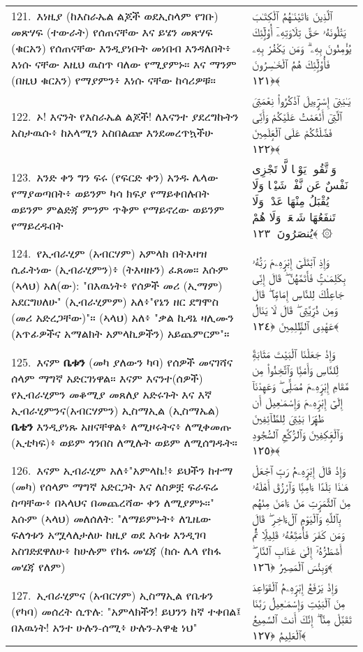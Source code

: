 \documentclass[11pt,a4paper,oneside]{article}%
\newcommand{\mytextarabic}[1]{\textarabic{ #1 \flushright}}
\begin{document}
\begin{longtable}{%
  @{}
    p{}
  @{~~~}
    p{}
    @{}
}
121.\ እነዚያ (ከእስራኤል ልጆች ወደኢስላም የገቡ) መጽሃፍ (ተውራት) የሰጠናቸው እና ይሄን መጽሃፍ (ቁርአን) የሰጠናቸው እንዲያነቡት መነበብ እንዳለበት፥ እነሱ ናቸው እዚህ ዉስጥ ባለው የሚያምኑ። እና ማንም (በዚህ ቁርአን) የማያምን፥ እነሱ ናቸው ከሳሪዎቹ። &  \mytextarabic{ ٱلَّذِينَ ءَاتَيْنَـٰهُمُ ٱلْكِتَـٰبَ يَتْلُونَهُۥ حَقَّ تِلَاوَتِهِۦٓ أُو۟لَٟٓئِكَ يُؤْمِنُونَ بِهِۦ ۗ وَمَن يَكْفُرْ بِهِۦ فَأُو۟لَٟٓئِكَ هُمُ ٱلْخَـٰسِرُونَ ﴿١٢١﴾}\\
122.\ ኦ! እናንት የእስራኤል ልጆች! ለእናንተ ያደረግኩትን አስታዉሱ፥ ከአላሚን አስበልጬ እንደመረጥኳችሁ &  \mytextarabic{يَـٰبَنِىٓ إِسْرَٟٓءِيلَ ٱذْكُرُوا۟ نِعْمَتِىَ ٱلَّتِىٓ أَنْعَمْتُ عَلَيْكُمْ وَأَنِّى فَضَّلْتُكُمْ عَلَى ٱلْعَٟلَمِينَ ﴿١٢٢﴾}\\
123.\ አንድ ቀን ግን ፍሩ (የፍርድ ቀን) አንዱ ሌላው የማያወጣበት፥ ወይንም ካሳ ክፍያ የማይቀበሉበት  ወይንም ምልድጃ ምንም ጥቅም የማይኖረው ወይንም የማይረዱበት &  \mytextarabic{وَٱتَّقُوا۟ يَوْمًۭا لَّا تَجْزِى نَفْسٌ عَن نَّفْسٍۢ شَيْـًۭٔا وَلَا يُقْبَلُ مِنْهَا عَدْلٌۭ وَلَا تَنفَعُهَا شَفَٟعَةٌۭ وَلَا هُمْ يُنصَرُونَ ﴿١٢٣﴾ ۞}\\
124.\ የኢብራሂም (አብርሃም) አምላክ በትእዛዝ ሲፈትነው (ኢብራሂምን)፥ (ትእዛዙን) ፈጸመ። እሱም (ኣላህ) አለ(ው): "በእዉነት፥ የሰዎች መሪ (ኢማም) አደርግሀለሁ" (ኢብራሂምም) አለ፥"የኔን ዘር ደግሞስ (መሪ አድረጋቸው)"። (ኣላህ) አለ፥ "ቃል ኪዳኔ ዛሊሙን (አጥፊዎችና አማልክት አምላኪዎችን) አይጨምርም"። &  \mytextarabic{وَإِذِ ٱبْتَلَىٰٓ إِبْرَٟهِۦمَ رَبُّهُۥ بِكَلِمَـٰتٍۢ فَأَتَمَّهُنَّ ۖ قَالَ إِنِّى جَاعِلُكَ لِلنَّاسِ إِمَامًۭا ۖ قَالَ وَمِن ذُرِّيَّتِى ۖ قَالَ لَا يَنَالُ عَهْدِى ٱلظَّٟلِمِينَ ﴿١٢٤﴾}\\
125.\ እናም  {\bf ቤቱን} (መካ ያለውን ካባ) የሰዎች መናገሻና ሰላም ማግኛ አድርገነዋል። እናም እናንተ(ሰዎች) የኢብራሂምን መቆሚያ መጸለያ አድሩጉት እና እኛ ኢብራሂምንና(አብርሃምን) ኢስማኢል (ኢስማኤል) {\bf ቤቴን} እንዲያነጹ አዘናቸዋል፥ ለሚዞሩትና፥ ለሚቀመጡ (ኢቲካፍ)፥ ወይም ጎንበስ ለሚሉት ወይም ለሚሰግዱት።  &  \mytextarabic{ وَإِذْ جَعَلْنَا ٱلْبَيْتَ مَثَابَةًۭ لِّلنَّاسِ وَأَمْنًۭا وَٱتَّخِذُوا۟ مِن مَّقَامِ إِبْرَٟهِۦمَ مُصَلًّۭى ۖ وَعَهِدْنَآ إِلَىٰٓ إِبْرَٟهِۦمَ وَإِسْمَـٰعِيلَ أَن طَهِّرَا بَيْتِىَ لِلطَّآئِفِينَ وَٱلْعَٟكِفِينَ وَٱلرُّكَّعِ ٱلسُّجُودِ ﴿١٢٥﴾}\\
126.\ እናም ኢብራሂም አለ፥"አምላኬ!፥ ይህችን ከተማ (መካ) የሰላም ማግኛ አድርጋት እና ለስዎቿ ፍራፍሬ ስጣቸው፥ በኣላህና በመጨረሻው ቀን ለሚያምኑ።" እሱም (ኣላህ) መለሰለት: "ለማይምኑት፥ ለጊዜው ፍለጎቱን አሟላለታለሁ ከዚያ ወደ እሳቱ እንዲገባ አስገድደዋለሁ፥ ከሁሉም የከፋ መሄጃ (ከሱ ሌላ የከፋ መሄጃ የለም) &  \mytextarabic{وَإِذْ قَالَ إِبْرَٟهِۦمُ رَبِّ ٱجْعَلْ هَـٰذَا بَلَدًا ءَامِنًۭا وَٱرْزُقْ أَهْلَهُۥ مِنَ ٱلثَّمَرَٟتِ مَنْ ءَامَنَ مِنْهُم بِٱللَّهِ وَٱلْيَوْمِ ٱلْءَاخِرِ ۖ قَالَ وَمَن كَفَرَ فَأُمَتِّعُهُۥ قَلِيلًۭا ثُمَّ أَضْطَرُّهُۥٓ إِلَىٰ عَذَابِ ٱلنَّارِ ۖ وَبِئْسَ ٱلْمَصِيرُ ﴿١٢٦﴾}\\
127.\ ኢብራሂምና (አብርሃም) ኢስማኢል የቤቱን (የካባ) መሰረት ሲጥሉ: "አምላክችን! ይህንን ከኛ ተቀበል፤ በእዉነት! አንተ ሁሉን-ሰሚ፥ ሁሉን-አዋቂ ነህ" &  \mytextarabic{ وَإِذْ يَرْفَعُ إِبْرَٟهِۦمُ ٱلْقَوَاعِدَ مِنَ ٱلْبَيْتِ وَإِسْمَـٰعِيلُ رَبَّنَا تَقَبَّلْ مِنَّآ ۖ إِنَّكَ أَنتَ ٱلسَّمِيعُ ٱلْعَلِيمُ ﴿١٢٧﴾}\\

\end{longtable}
\end{document}
